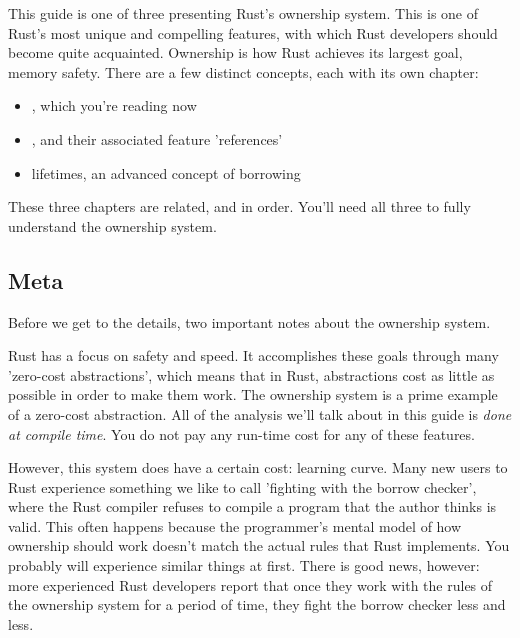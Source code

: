 This guide is one of three presenting Rust's ownership system. This is one of Rust's most unique and compelling features, with 
which Rust developers should become quite acquainted. Ownership is how Rust achieves its largest goal, memory safety. There are 
a few distinct concepts, each with its own chapter:

\begin{itemize}
  \item{, which you're reading now}
  \item{, and their associated feature 'references'}
  \item{lifetimes, an advanced concept of borrowing}
\end{itemize}

These three chapters are related, and in order. You'll need all three to fully understand the ownership system.

\subsection*{Meta}

Before we get to the details, two important notes about the ownership system.

\blank

Rust has a focus on safety and speed. It accomplishes these goals through many 'zero-cost abstractions', which means that in 
Rust, abstractions cost as little as possible in order to make them work. The ownership system is a prime example of a zero-cost
abstraction. All of the analysis we'll talk about in this guide is \emph{done at compile time}. You do not pay any run-time cost 
for any of these features.

\blank

However, this system does have a certain cost: learning curve. Many new users to Rust experience something we like to call 
'fighting with the borrow checker', where the Rust compiler refuses to compile a program that the author thinks is valid. 
This often happens because the programmer's mental model of how ownership should work doesn't match the actual rules that Rust 
implements. You probably will experience similar things at first. There is good news, however: more experienced Rust developers 
report that once they work with the rules of the ownership system for a period of time, they fight the borrow checker less and less.

\blank

